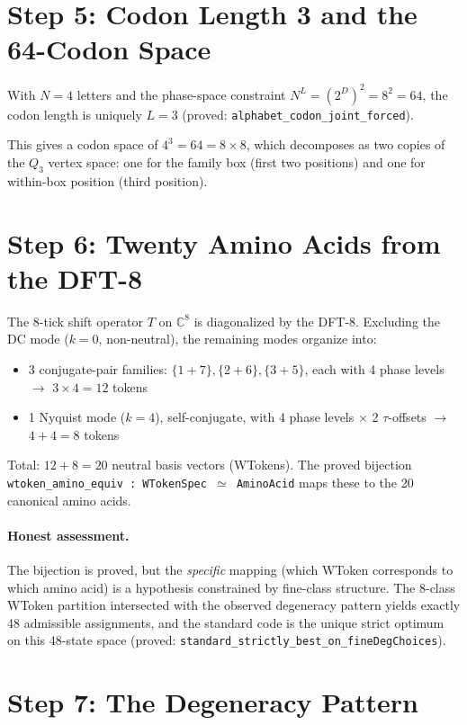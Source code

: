 \documentclass[11pt,twocolumn]{article}
\newcommand{\lean}[1]{\texttt{#1}}
\begin{document}
\section{Step 5: Codon Length 3 and the 64-Codon Space}

With $N = 4$ letters and the phase-space constraint
$N^L = (2^D)^2 = 8^2 = 64$, the codon length is uniquely $L = 3$
(proved: \lean{alphabet\_codon\_joint\_forced}).

This gives a codon space of $4^3 = 64 = 8 \times 8$, which decomposes
as two copies of the $Q_3$ vertex space: one for the family box
(first two positions) and one for within-box position (third position).

\section{Step 6: Twenty Amino Acids from the DFT-8}

The 8-tick shift operator $T$ on $\mathbb{C}^8$ is diagonalized by the
DFT-8. Excluding the DC mode ($k = 0$, non-neutral), the remaining
modes organize into:
\begin{itemize}
\item 3 conjugate-pair families: $\{1{+}7\}, \{2{+}6\}, \{3{+}5\}$,
  each with 4 phase levels $\to$ $3 \times 4 = 12$ tokens
\item 1 Nyquist mode ($k = 4$), self-conjugate, with 4 phase levels
  $\times$ 2 $\tau$-offsets $\to$ $4 + 4 = 8$ tokens
\end{itemize}

Total: $12 + 8 = 20$ neutral basis vectors (WTokens). The proved
bijection \lean{wtoken\_amino\_equiv : WTokenSpec $\simeq$ AminoAcid}
maps these to the 20 canonical amino acids.

\paragraph{Honest assessment.} The bijection is proved, but the
\emph{specific} mapping (which WToken corresponds to which amino acid)
is a hypothesis constrained by fine-class structure. The 8-class WToken
partition intersected with the observed degeneracy pattern yields exactly
48 admissible assignments, and the standard code is the unique strict
optimum on this 48-state space (proved:
\lean{standard\_strictly\_best\_on\_fineDegChoices}).

\section{Step 7: The Degeneracy Pattern}
\end{document}
